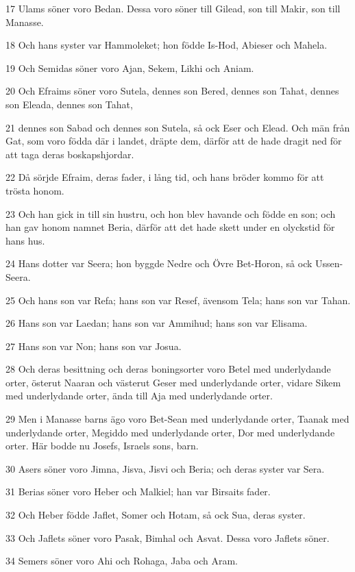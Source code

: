 \par 17 Ulams söner voro Bedan. Dessa voro söner till Gilead, son till Makir, son till Manasse.
\par 18 Och hans syster var Hammoleket; hon födde Is-Hod, Abieser och Mahela.
\par 19 Och Semidas söner voro Ajan, Sekem, Likhi och Aniam.
\par 20 Och Efraims söner voro Sutela, dennes son Bered, dennes son Tahat, dennes son Eleada, dennes son Tahat,
\par 21 dennes son Sabad och dennes son Sutela, så ock Eser och Elead. Och män från Gat, som voro födda där i landet, dräpte dem, därför att de hade dragit ned för att taga deras boskapshjordar.
\par 22 Då sörjde Efraim, deras fader, i lång tid, och hans bröder kommo för att trösta honom.
\par 23 Och han gick in till sin hustru, och hon blev havande och födde en son; och han gav honom namnet Beria, därför att det hade skett under en olyckstid för hans hus.
\par 24 Hans dotter var Seera; hon byggde Nedre och Övre Bet-Horon, så ock Ussen-Seera.
\par 25 Och hans son var Refa; hans son var Resef, ävensom Tela; hans son var Tahan.
\par 26 Hans son var Laedan; hans son var Ammihud; hans son var Elisama.
\par 27 Hans son var Non; hans son var Josua.
\par 28 Och deras besittning och deras boningsorter voro Betel med underlydande orter, österut Naaran och västerut Geser med underlydande orter, vidare Sikem med underlydande orter, ända till Aja med underlydande orter.
\par 29 Men i Manasse barns ägo voro Bet-Sean med underlydande orter, Taanak med underlydande orter, Megiddo med underlydande orter, Dor med underlydande orter. Här bodde nu Josefs, Israels sons, barn.
\par 30 Asers söner voro Jimna, Jisva, Jisvi och Beria; och deras syster var Sera.
\par 31 Berias söner voro Heber och Malkiel; han var Birsaits fader.
\par 32 Och Heber födde Jaflet, Somer och Hotam, så ock Sua, deras syster.
\par 33 Och Jaflets söner voro Pasak, Bimhal och Asvat. Dessa voro Jaflets söner.
\par 34 Semers söner voro Ahi och Rohaga, Jaba och Aram.
